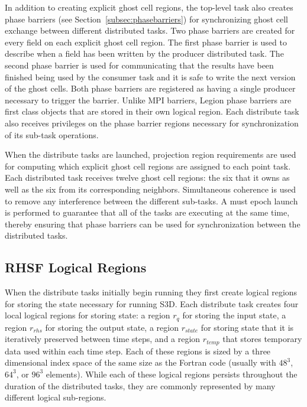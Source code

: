 In addition to creating explicit ghost cell regions,
the top-level task also creates phase barriers 
(see Section~\ref{subsec:phasebarriers}) for
synchronizing ghost cell exchange between different 
distributed tasks. Two phase barriers are created for
every field on each explicit ghost cell region. The
first phase barrier is used to describe when a field
has been written by the producer distributed
task. The second phase barrier is used for communicating
that the results have been finished being used by
the consumer task and it is safe to write the next
version of the ghost cells. Both phase barriers are
registered as having a single producer necessary to
trigger the barrier. Unlike MPI barriers, Legion phase
barriers are first class objects that are stored in
their own logical region. Each distribute task 
also receives privileges on the phase barrier regions
necessary for synchronization of its sub-task operations.

When the distribute tasks are launched, projection
region requirements are used for computing which explicit
ghost cell regions are assigned to each point task. Each
distributed task receives twelve ghost cell regions: the
six that it owns as well as the six from its corresponding
neighbors. Simultaneous coherence is used to remove any
interference between the different sub-tasks. A must epoch
launch is performed to guarantee that all of the tasks
are executing at the same time, thereby ensuring that
phase barriers can be used for synchronization between
the distributed tasks.

\subsection{RHSF Logical Regions}
\label{subsec:rhsfregs}
When the distribute tasks initially begin running
they first create logical regions for storing the state
necessary for running S3D. Each distribute task creates
four local logical regions for storing state: a
region $r_q$ for storing the input state, a region 
$r_{rhs}$ for storing the output state, a region 
$r_{state}$ for storing state that it is iteratively
preserved between time steps, and a region $r_{temp}$
that stores temporary data used within each time
step. Each of these regions is sized by a three 
dimensional index space of the same size as the 
Fortran code (usually with $48^3$, $64^3$, or 
$96^3$ elements). While each of these logical regions
persists throughout the duration of the distributed
tasks, they are commonly represented by many different
logical sub-regions.


